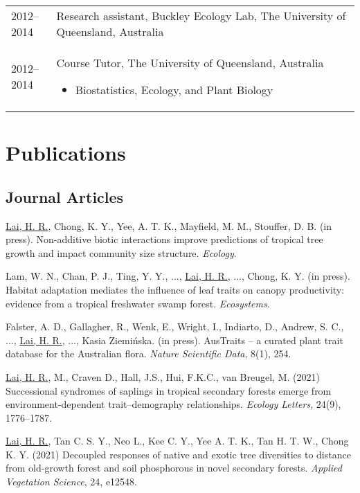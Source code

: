 \documentclass[a4paper]{article}
\begin{document}
\begin{tabular}{p{0.13\linewidth} p{0.87\linewidth}}
2012--2014 & Research assistant, Buckley Ecology Lab, The University of Queensland, Australia \\

2012--2014 & Course Tutor, The University of Queensland, Australia
\begin{itemize} 
\item Biostatistics, Ecology, and Plant Biology
\end{itemize} \\

\end{tabular}


\section*{Publications}

\subsection*{Journal Articles}

\hangindent=1cm \underline{Lai, H. R.}, Chong, K. Y., Yee, A. T. K., Mayfield, M. M., Stouffer, D. B. (in press). Non-additive biotic interactions improve predictions of tropical tree growth and impact community size structure. \textit{Ecology}.

\hangindent=1cm Lam, W. N., Chan, P. J., Ting, Y. Y., ..., \underline{Lai, H. R.}, ..., Chong, K. Y. (in press). Habitat adaptation mediates the influence of leaf traits on canopy productivity: evidence from a tropical freshwater swamp forest. \textit{Ecosystems}.

\hangindent=1cm Falster, A. D., Gallagher, R., Wenk, E., Wright, I., Indiarto, D., Andrew, S. C., ..., \underline{Lai, H. R.}, ..., Kasia Ziemińska. (in press). AusTraits -- a curated plant trait database for the Australian flora. \textit{Nature Scientific Data}, 8(1), 254. 

\hangindent=1cm \underline{Lai, H. R.}, M., Craven D., Hall, J.S., Hui, F.K.C., van Breugel, M. (2021) Successional syndromes of saplings in tropical secondary forests emerge from environment-dependent trait--demography relationships. \textit{Ecology Letters}, 24(9), 1776--1787.

\hangindent=1cm \underline{Lai, H. R.}, Tan C. S. Y., Neo L., Kee C. Y., Yee A. T. K., Tan H. T. W., Chong K. Y. (2021) Decoupled responses of native and exotic tree diversities to distance from old-growth forest and soil phosphorous in novel secondary forests. \textit{Applied Vegetation Science}, 24, e12548. 
\end{document}
